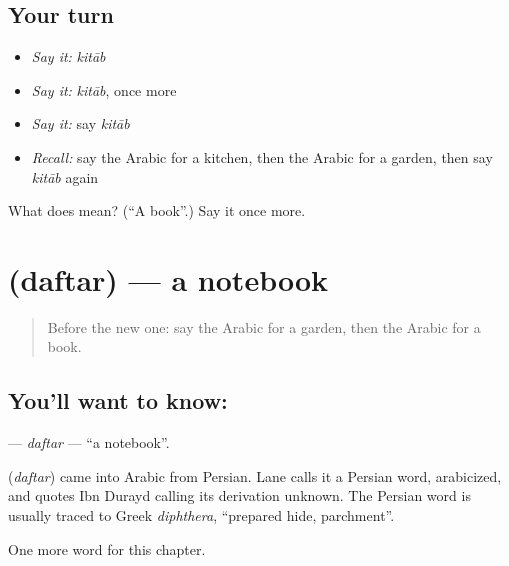 \subsection*{Your turn}
\begin{itemize}
\raggedright
  \item \emph{Say it:} \emph{kitāb}
  \item \emph{Say it:} \emph{kitāb}, once more
  \item \emph{Say it:} say \emph{kitāb}
  \item \emph{Recall:} say the Arabic for a kitchen, then the Arabic for a garden, then say \emph{kitāb} again
\end{itemize}

\begin{tcolorbox}[breakable,colback=teal!4,colframe=teal!35!black,title={Before you move on}]
What does  mean? (\textquotedblleft{}A book\textquotedblright{}.) Say it once more.
\end{tcolorbox}
\section[\texorpdfstring{\ar{دفتر} (daftar)}{دفتر (daftar)}]{ (daftar) — a notebook}

\label{lesson:AR-C73-daftar}



\begin{quote}
Before the new one: say the Arabic for a garden, then the Arabic for a book.
\end{quote}

\subsection*{You'll want to know: }
\textbf{} — \emph{daftar} — \textquotedblleft{}a notebook\textquotedblright{}.

\begin{cousinweb}
\textbf{} (\emph{daftar}) came into Arabic from Persian. Lane calls it a Persian word, arabicized, and quotes Ibn Durayd calling its derivation unknown. The Persian word is usually traced to Greek \emph{diphthera}, \textquotedblleft{}prepared hide, parchment\textquotedblright{}.
\end{cousinweb}

\begin{grammarlens}[title={What you've built}]
One more word for this chapter.
\end{grammarlens}

